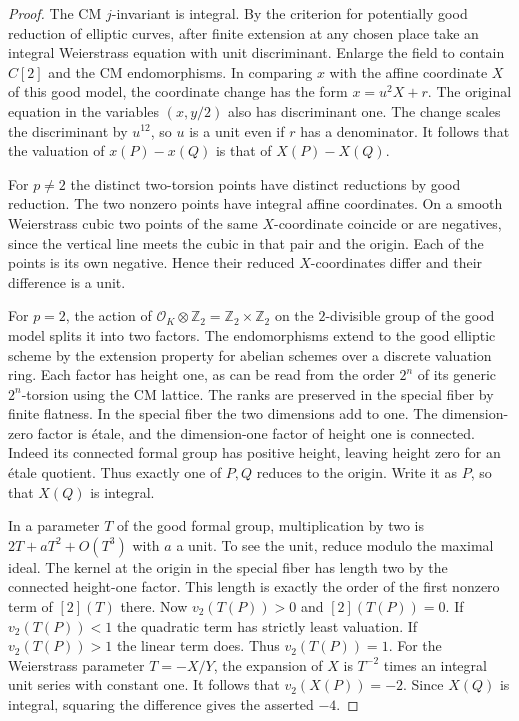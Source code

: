 \documentclass[a4paper,11pt]{article}
\theoremstyle{definition}
\theoremstyle{remark}
\newcommand{\ZZ}{\mathbb Z}\newcommand{\ord}{\operatorname{ord}}
\numberwithin{equation}{section}
\begin{document}
\begin{proof}
The CM \(j\)-invariant is integral. By the criterion for potentially
good reduction of elliptic curves, after finite extension at any
chosen place take an integral Weierstrass equation with unit
discriminant. Enlarge the field to contain \(C[2]\) and the CM
endomorphisms. In comparing \(x\) with the affine coordinate
\(X\) of this good model, the coordinate change has the form
\(x=u^2X+r\). The original equation in the variables \((x,y/2)\)
also has discriminant one. The change scales the discriminant by
\(u^{12}\), so \(u\) is a unit even if \(r\) has a denominator.
It follows that the valuation of \(x(P)-x(Q)\) is that of
\(X(P)-X(Q)\).

For \(p\ne2\) the distinct two-torsion points have distinct
reductions by good reduction. The two nonzero points have integral
affine coordinates. On a smooth Weierstrass cubic two points of
the same \(X\)-coordinate coincide or are negatives, since the
vertical line meets the cubic in that pair and the origin.
Each of the points is its own negative. Hence their reduced
\(X\)-coordinates differ and their difference is a unit.

For \(p=2\), the action of
\(\mathcal O_K\otimes\ZZ_2=\ZZ_2\times\ZZ_2\) on the
\(2\)-divisible group of the good model splits it into two factors.
The endomorphisms extend to the good elliptic scheme by the
extension property for abelian schemes over a discrete valuation
ring. Each factor has height one, as can be read from the order
\(2^n\) of its generic \(2^n\)-torsion using the CM lattice.
The ranks are preserved in the special fiber by finite flatness.
In the special fiber the two dimensions add to one. The
dimension-zero factor is \'{e}tale, and the dimension-one factor
of height one is connected. Indeed its connected formal group
has positive height, leaving height zero for an \'{e}tale quotient.
Thus exactly one of \(P,Q\) reduces to the origin. Write it as
\(P\), so that \(X(Q)\) is integral.

In a parameter \(T\) of the good formal group, multiplication by
two is \(2T+aT^2+O(T^3)\) with \(a\) a unit. To see the unit,
reduce modulo the maximal ideal. The kernel at the origin in the
special fiber has length two by the connected height-one factor.
This length is exactly the order of the first nonzero term of
\([2](T)\) there. Now \(v_2(T(P))>0\) and \([2](T(P))=0\).
If \(v_2(T(P))<1\) the quadratic term has strictly least valuation.
If \(v_2(T(P))>1\) the linear term does. Thus \(v_2(T(P))=1\).
For the Weierstrass parameter \(T=-X/Y\), the expansion of \(X\)
is \(T^{-2}\) times an integral unit series with constant one.
It follows that \(v_2(X(P))=-2\). Since \(X(Q)\) is integral,
squaring the difference gives the asserted \(-4\).


\end{proof}
\end{document}
